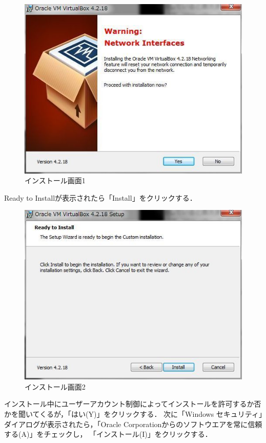 \begin{figure}[H]
\centering
\includegraphics[width=15cm]{virtualbox002.png}
\caption{インストール画面1}\label{virtualboxインストール画面1}
\end{figure}

Ready to Installが表示されたら「Install」をクリックする．
\begin{figure}[H]
\centering
\includegraphics[width=15cm]{virtualbox003.png}
\caption{インストール画面2}\label{virtualboxインストール画面2}
\end{figure}

インストール中にユーザーアカウント制御によってインストールを許可するか否かを聞いてくるが，「はい(Y)」をクリックする．
次に「Windows セキュリティ」ダイアログが表示されたら，「Oracle Corporationからのソフトウエアを常に信頼する(A)」をチェックし，
「インストール(I)」をクリックする．

